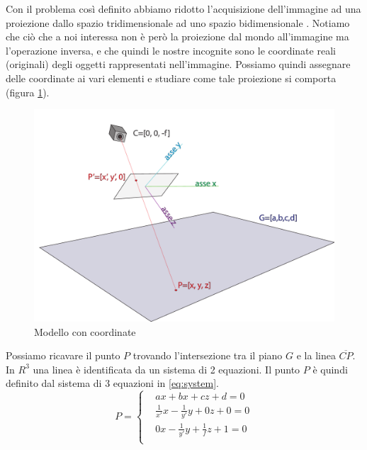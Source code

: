 Con il problema così definito abbiamo ridotto l'acquisizione dell'immagine ad una proiezione dallo spazio tridimensionale ad uno spazio bidimensionale .
Notiamo che ciò che a noi interessa non è però la proiezione dal mondo all'immagine ma l'operazione inversa, e che quindi le nostre incognite sono le coordinate reali (originali) degli oggetti rappresentati nell'immagine.
Possiamo quindi assegnare delle coordinate ai vari elementi e studiare come tale proiezione si comporta (figura \ref{fig:camera coords}).
\begin{figure}
    \caption{Modello con coordinate}
    \label{fig:camera coords}
    \centering
    \includegraphics[width=.85\textwidth]{images/camera coords.pdf}
\end{figure}

Possiamo ricavare il punto $P$ trovando l'intersezione tra il piano $G$ e la linea $\overline{CP}$.
In $R^3$ una linea è identificata da un sistema di 2 equazioni.
Il punto $P$ è quindi definito dal sistema di 3 equazioni in \ref{eq:system}.
\begin{equation}
    \label{eq:system}
    P = 
    \left\{
    \begin{aligned}
         & ax + bx + cz + d = 0                       \\
         & \frac{1}{x'}x - \frac{1}{y'}y + 0z + 0 = 0 \\
         & 0x -  \frac{1}{y'}y + \frac{1}{f}z + 1 = 0 \\
    \end{aligned}
    \right.
\end{equation}

